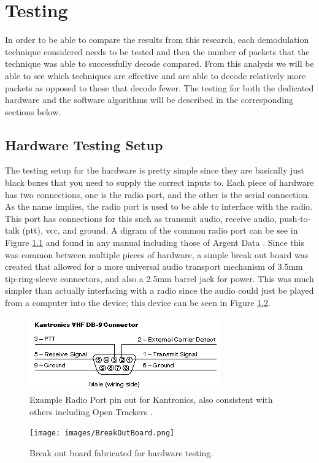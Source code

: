 \chapter{Testing}
In order to be able to compare the results from this research, each demodulation technique considered needs to be tested and then the number of packets that the technique was able to successfully decode compared. From this analysis we will be able to see which techniques are effective and are able to decode relatively more packets as opposed to those that decode fewer. The testing for both the dedicated hardware and the software algorithms will be described in the corresponding sections below.

\section{Hardware Testing Setup}
The testing setup for the hardware is pretty simple since they are basically just black boxes that you need to supply the correct inputs to. Each piece of hardware has two connections, one is the radio port, and the other is the serial connection. As the name implies, the radio port is used to be able to interface with the radio. This port has connections for this such as transmit audio, receive audio, push-to-talk (ptt), vcc, and ground. A digram of the common radio port can be see in Figure \ref{RadioPortPinout} and found in any manual including those of Argent Data \cite{Systems2013}. Since this was common between multiple pieces of hardware, a simple break out board was created that allowed for a more universal audio transport mechanism of 3.5mm tip-ring-sleeve connectors, and also a 2.5mm barrel jack for power. This was much simpler than actually interfacing with a radio since the audio could just be played from a computer into the device; this device can be seen in Figure \ref{BreakOutBoard}. 

\begin{figure}
  \centering
	\includegraphics[width=0.75\linewidth]{images/RadioPortPinout.png} 
	\caption{Example Radio Port pin out for Kantronics, also consistent with others including Open Trackers \cite{Martin2014}.}
   \label{RadioPortPinout}
\end{figure}
\begin{figure}
  \centering
	\texttt{[image: images/BreakOutBoard.png]} 
	\caption{Break out board fabricated for hardware testing.}
   \label{BreakOutBoard}
\end{figure}

